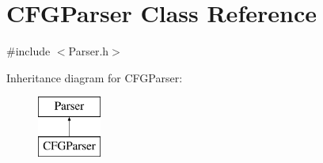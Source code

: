 \hypertarget{classCFGParser}{\section{\-C\-F\-G\-Parser \-Class \-Reference}
\label{da/d24/classCFGParser}
}


{\ttfamily \#include $<$\-Parser.\-h$>$}

\-Inheritance diagram for \-C\-F\-G\-Parser\-:\begin{figure}[H]
\begin{center}
\leavevmode
\includegraphics[height=2.000000cm]{da/d24/classCFGParser}
\end{center}
\end{figure}

